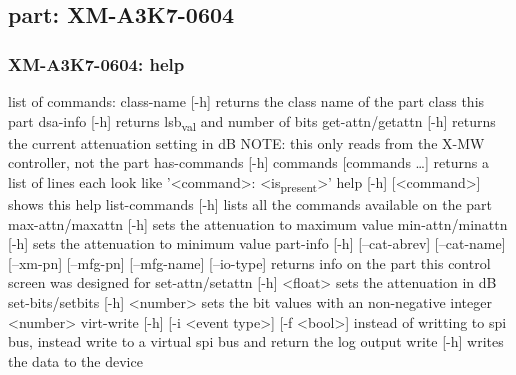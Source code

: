 \documentclass[11pt]{article}
\begin{document}
\subsection{part: XM-A3K7-0604}
\label{sec:org49630fc}
\subsubsection{XM-A3K7-0604: help}
\label{sec:org3e10add}
list of commands:
  class-name [-h]
    returns the class name of the part class this part
  dsa-info [-h]
    returns lsb\textsubscript{val} and number of bits
  get-attn/getattn [-h]
    returns the current attenuation setting in dB
    NOTE: this only reads from the X-MW controller, not the part
  has-commands [-h] commands [commands \ldots{}]
    returns a list of lines each look like '<command>: <is\textsubscript{present}>'
  help [-h] [<command>]
    shows this help
  list-commands [-h]
    lists all the commands available on the part
  max-attn/maxattn [-h]
    sets the attenuation to maximum value
  min-attn/minattn [-h]
    sets the attenuation to minimum value
  part-info  [-h] [--cat-abrev] [--cat-name] [--xm-pn] [--mfg-pn] [--mfg-name]
          [--io-type]
    returns info on the part this control screen was designed for
  set-attn/setattn [-h] <float>
    sets the attenuation in dB
  set-bits/setbits [-h] <number>
    sets the bit values with an non-negative integer <number>
  virt-write [-h] [-i <event type>] [-f <bool>]
    instead of writting to spi bus, instead write to a virtual spi bus
    and return the log output
  write [-h]
    writes the data to the device
\end{document}
